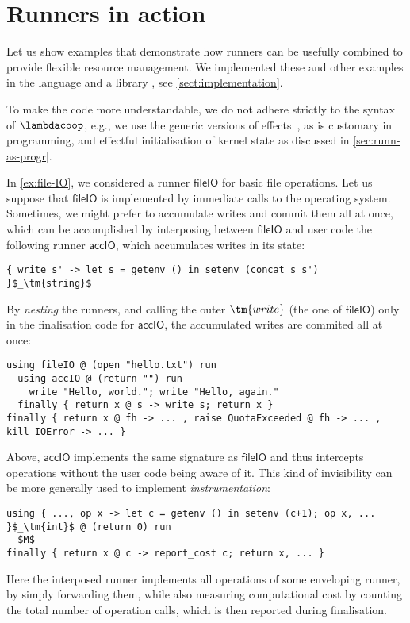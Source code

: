 
\section{Runners in action}
\label{sect:examples}

Let us show examples that demonstrate how runners can be usefully combined to provide flexible
resource management.
%
We implemented these and other examples in the language  and a library
, see \cref{sect:implementation}.

To make the code more understandable, we do not adhere strictly to the syntax of
$\lambdacoop$, e.g., we use the generic versions of effects~\cite{Plotkin:AlgOperations}, 
as is customary in programming, and effectful initialisation of 
kernel state as discussed in \cref{sec:runn-as-progr}.

\begin{example}[Nesting]
\label{ex:nesting}
  In \cref{ex:file-IO}, we considered a runner $\mathsf{fileIO}$ for basic file
  operations. Let us suppose that $\mathsf{fileIO}$ is implemented by immediate calls to the
  operating system. Sometimes, we might prefer to accumulate writes and
  commit them all at once, which can be accomplished by interposing between $\mathsf{fileIO}$
  and user code the following runner $\mathsf{accIO}$, which accumulates writes in its state:
\begin{lstlisting}
{ write s' -> let s = getenv () in setenv (concat s s') }$_\tm{string}$
\end{lstlisting}
By \emph{nesting} the runners, and calling the outer $\tm{write}$ (the one of $\mathsf{fileIO}$) only in the finalisation
code for $\mathsf{accIO}$, the accumulated writes are commited all at once:
%
\begin{lstlisting}
using fileIO @ (open "hello.txt") run
  using accIO @ (return "") run
    write "Hello, world."; write "Hello, again."
  finally { return x @ s -> write s; return x }
finally { return x @ fh -> ... , raise QuotaExceeded @ fh -> ... , kill IOError -> ... }
\end{lstlisting}
\end{example}

\begin{example}[Instrumentation]
%
Above, $\mathsf{accIO}$ implements the same signature as $\mathsf{fileIO}$ and
thus intercepts operations without the user code being aware of it.
This kind of invisibility
can be more generally used to implement \emph{instrumentation}:
%
\begin{lstlisting}
using { ..., op x -> let c = getenv () in setenv (c+1); op x, ... }$_\tm{int}$ @ (return 0) run
  $M$
finally { return x @ c -> report_cost c; return x, ... }
\end{lstlisting}
%
Here the interposed runner implements all operations of some enveloping runner,
by simply forwarding them, 
while also measuring computational cost 
by counting the total number of operation calls, 
which is then reported during finalisation.
\end{example}

